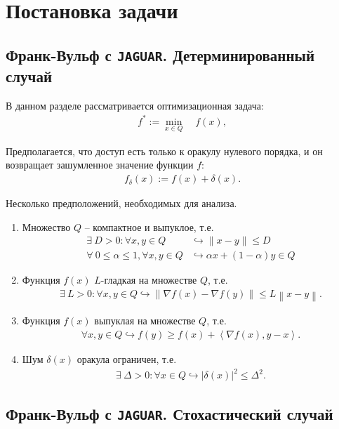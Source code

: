\section{Постановка задачи} \label{sec:Problem_statement}

\subsection{Франк-Вульф с \texttt{JAGUAR}. Детерминированный случай}

    В данном разделе рассматривается оптимизационная задача:
    \begin{align} \label{eq:problem_nonstoch}
        f^* := \underset{x \in Q}{\min} \quad f(x),
    \end{align}
    
    Предполагается, что доступ есть только к оракулу нулевого порядка, и он возвращает зашумленное значение функции $f$:
    \begin{align*}
        f_{\delta}(x) := f(x) + \delta(x).
    \end{align*}
    
    Несколько предположений, необходимых для анализа.

    \begin{enumerate}
        \item Множество $Q$ -- компактное и выпуклое, т.е.
        \begin{align} \label{ass:compact}
            \exists\ D > 0 : \forall x, y \in Q &\hookrightarrow \|x - y\| \leq D\\
            \forall\ 0 \leq \alpha \leq 1, \forall x, y \in Q &\hookrightarrow \alpha x + (1-\alpha) y \in Q
        \end{align}
        \item Функция $f(x)$ $L$-гладкая на множестве $Q$, т.е.
        \begin{align} \label{ass:smooth_nonstoch}
            \exists\ L > 0 : \forall x, y \in Q \hookrightarrow \left\| \nabla f(x) - \nabla f(y) \right\| \leq L \left\| x - y \right\|.
        \end{align}
        \item Функция $f(x)$ выпуклая на множестве $Q$, т.е.
        \begin{align} \label{ass:conv}
            \forall x, y \in Q \hookrightarrow f(y) \geq f(x) + \left< \nabla f(x), y - x \right>.
        \end{align}
        \item Шум $\delta(x)$ оракула ограничен, т.е.
        \begin{align} \label{ass:bounded_nonstoch}
            \exists\ \Delta > 0 : \forall x \in Q \hookrightarrow |\delta(x)|^2 \leq \Delta^2.
        \end{align}
    \end{enumerate}

\subsection{Франк-Вульф с \texttt{JAGUAR}. Стохастический случай}